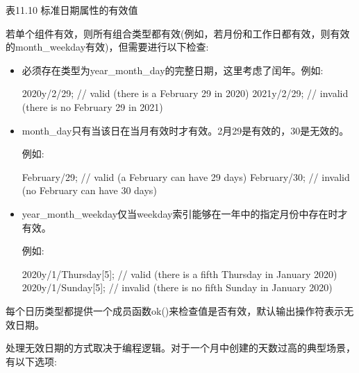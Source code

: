 \begin{center}
表11.10 标准日期属性的有效值
\end{center}

若单个组件有效，则所有组合类型都有效(例如，若月份和工作日都有效，则有效的month\_weekday有效)，但需要进行以下检查:

\begin{itemize}
\item 
必须存在类型为year\_month\_day的完整日期，这里考虑了闰年。例如:

\begin{cpp}
2020y/2/29; // valid (there is a February 29 in 2020)
2021y/2/29; // invalid (there is no February 29 in 2021)
\end{cpp}

\item 
month\_day只有当该日在当月有效时才有效。2月29是有效的，30是无效的。

例如:

\begin{cpp}
February/29; // valid (a February can have 29 days)
February/30; // invalid (no February can have 30 days)
\end{cpp}

\item 
year\_month\_weekday仅当weekday索引能够在一年中的指定月份中存在时才有效。

例如:

\begin{cpp}
2020y/1/Thursday[5]; // valid (there is a fifth Thursday in January 2020)
2020y/1/Sunday[5]; // invalid (there is no fifth Sunday in January 2020)
\end{cpp}
\end{itemize}

每个日历类型都提供一个成员函数ok()来检查值是否有效，默认输出操作符表示无效日期。

处理无效日期的方式取决于编程逻辑。对于一个月中创建的天数过高的典型场景，有以下选项:

